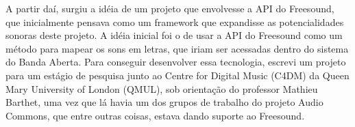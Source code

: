 A partir daí, surgiu a idéia de um projeto que envolvesse a API do Freesound, que inicialmente pensava como um framework que expandisse as potencialidades sonoras deste projeto. A idéia inicial foi o de usar a API do Freesound como um método para mapear os sons em letras, que iriam ser acessadas dentro do sistema do Banda Aberta. Para conseguir desenvolver essa tecnologia, escrevi um projeto para um estágio de pesquisa junto ao Centre for Digital Music (C4DM) da Queen Mary University of London (QMUL),  sob orientação do professor Mathieu Barthet, uma vez que lá havia um dos grupos de trabalho do projeto Audio Commons, que entre outras coisas, estava dando suporte ao Freesound. 








